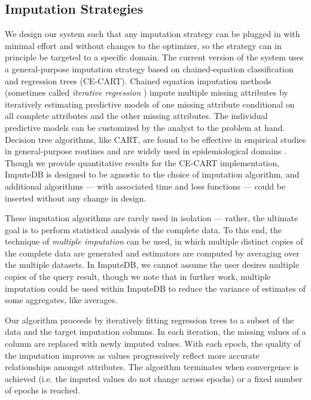 \subsection{Imputation Strategies}
\label{sec:imputation}

We design our system such that any imputation strategy can be plugged in with minimal effort
and without changes to the optimizer, so the strategy can in principle be targeted to a
specific domain. The current version of the system uses a general-purpose imputation
strategy based on chained-equation classification and regression trees (CE-CART). Chained
equation imputation methods \cite{vanbuuren2011mice} (sometimes called \textit{iterative
regression} \cite{gelman2006data}) impute multiple missing attributes by
iteratively estimating predictive models of one missing attribute conditional on all
complete attributes and the other missing attributes. The individual predictive models can
be customized by the analyst to the problem at hand. Decision tree algorithms, like CART,
are found to be effective \cite{akande2015empirical} in empirical studies in general-purpose
routines and are widely used in epidemiological domains \cite{burgette2010multiple}. Though
we provide quantitative results for the CE-CART implementation, ImputeDB is designed to be
agnostic to the choice of imputation algorithm, and additional algorithms --- with
associated time and loss functions --- could be inserted without any change in design.

These imputation algorithms are rarely used in isolation --- rather, the ultimate goal is to
perform statistical analysis of the complete data. To this end, the technique of
\textit{multiple imputation} can be used, in which multiple distinct copies of the complete
data are generated and estimators are computed by averaging over the multiple datasets. In
ImputeDB, we cannot assume the user desires multiple copies of the query result, though we
note that in further work, multiple imputation could be used within ImputeDB to reduce the
variance of estimates of some aggregates, like averages.

Our algorithm proceeds by iteratively fitting regression trees to a subset of the data and
the target imputation columns. In each iteration, the missing values of a column are
replaced with newly imputed values. With each epoch, the quality of the imputation improves
as values progressively reflect more accurate relationships amongst attributes. The
algorithm terminates when convergence is achieved (i.e. the imputed values do not change across
epochs) or a fixed number of epochs is reached. 


